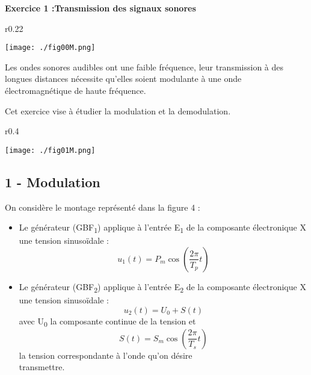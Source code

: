 \documentclass[12pt, french]{article}
\begin{document}
\begin{center}
\end{center}

\vspace{-0.2cm}



\begin{Box2}{\textbf{Exercice 1 :Transmission des signaux sonores} }
\begin{wrapfigure}{r}{0.22\textwidth}
  \begin{center}
	  \vspace{-0.6cm}
	\texttt{[image: ./fig00M.png]}
  \end{center}
\end{wrapfigure}

Les ondes sonores audibles ont une faible fréquence, leur transmission à des longues distances nécessite qu'elles soient modulante à une onde électromagnétique de haute fréquence.

Cet exercice vise à étudier la modulation et la demodulation.

\begin{wrapfigure}{r}{0.4\textwidth}
  \begin{center}
	  \vspace{-5.5cm}
	\texttt{[image: ./fig01M.png]}
  \end{center}
\end{wrapfigure}

\subsection*{1 - Modulation}
On considère le montage représenté dans la figure 4 :
\begin{itemize}
    \item Le générateur (GBF\textsubscript{1}) applique à l'entrée E\textsubscript{1} de la composante électronique X une tension sinusoïdale :
    \[u_1(t) = P_m\cos\left(\frac{2\pi}{T_p}t\right)\]
    
    \item Le générateur (GBF\textsubscript{2}) applique à l'entrée E\textsubscript{2} de la composante électronique X une tension sinusoïdale :
    \[u_2(t) = U_0 + S(t)\]
    avec U\textsubscript{0} la composante continue de la tension et
    \[S(t) = S_m\cos\left(\frac{2\pi}{T_s}t\right)\]
    la tension correspondante à l'onde qu'on désire\\ transmettre.
\end{itemize}


\end{Box2}
\end{document}

